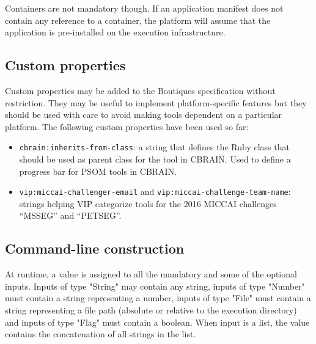 \documentclass{article}
\begin{document}
Containers are not mandatory though. If an application manifest does
not contain any reference to a container, the platform will assume
that the application is pre-installed on the execution infrastructure. 

\subsection{Custom properties}

Custom properties may be added to the Boutiques specification without
restriction. They may be useful to implement platform-specific
features but they should be used with care to avoid making tools
dependent on a particular platform. The following custom properties
have been used so far:
\begin{itemize}
\item \texttt{cbrain:inherits-from-class}: a string that defines the
  Ruby class that should be used as parent class for the tool in
  CBRAIN. Used to define a progress bar for PSOM tools in CBRAIN.
\item \texttt{vip:miccai-challenger-email} and
  \texttt{vip:miccai-challenge-team-name}: strings helping VIP
  categorize tools for the 2016 MICCAI challenges ``MSSEG'' and
  ``PETSEG''.
\end{itemize}

\subsection{Command-line construction}

At runtime, a value is assigned to all the mandatory and some of the
optional inputs. Inputs of type "String" may contain any string,
inputs of type "Number" must contain a string representing a number,
inputs of type "File" must contain a string representing a file path
(absolute or relative to the execution directory) and inputs of type
"Flag" must contain a boolean. When input is a list, the value
contains the concatenation of all strings in the list.
\end{document}
